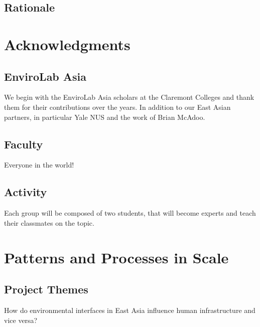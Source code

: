 \subsection{Rationale}


\section{Acknowledgments}

\subsection{EnviroLab Asia}

We begin with the EnviroLab Asia scholars at the Claremont Colleges and thank them for their contributions over the years. In addition to our East Asian partners, in particular Yale NUS and the work of Brian McAdoo. 

\subsection{Faculty}

Everyone in the world!






\subsection{Activity}

Each group will be composed of two students, that will become experts and teach their classmates on the topic. 


\section{Patterns and Processes in Scale}

\subsection{Project Themes}

How do environmental interfaces in East Asia influence human infrastructure and vice versa?

